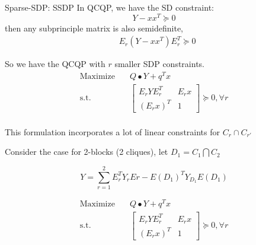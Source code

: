 \begin{frame}{Sparse-SDP: SSDP}
  In QCQP, we have the SD constraint:
  \[Y - xx^T \succeq 0\]
  then any subprinciple matrix is also semidefinite,
  \begin{equation}
    \begin{aligned}
       & E_r (Y - x x^T) E_r^T \succeq 0
    \end{aligned}
  \end{equation}

  So we have the QCQP with \(r\) smaller SDP constraints.
  \begin{equation}
    \begin{aligned}
      \mathrm{Maximize}\quad & Q \bullet Y + q^Tx                               \\
      \mathrm{s.t.} \quad    & \begin{bmatrix}E_r Y E_r^T & E_rx \\ (E_rx)^T & 1\end{bmatrix}   \succeq 0, \forall r \\
    \end{aligned}
  \end{equation}

  This formulation incorporates a lot of linear constraints for \(C_r \cap C_{r'}\)
\end{frame}
\begin{frame}
  Consider the case for 2-blocks (2 cliques), let \(D_1 = C_1 \bigcap C_2\)

  \begin{equation}
    Y =  \sum_{r=1}^2 E_r^TY_r Er - E(D_1)^TY_{D_1}E(D_1)
  \end{equation}

  \begin{equation}
    \begin{aligned}
      \mathrm{Maximize}\quad & Q \bullet Y + q^Tx                               \\
      \mathrm{s.t.} \quad    & \begin{bmatrix}E_r Y E_r^T & E_rx \\ (E_rx)^T & 1\end{bmatrix}   \succeq 0, \forall r \\
    \end{aligned}
  \end{equation}
\end{frame}

\begin{frame}
  \scriptsize
  \printbibliography
\end{frame}

